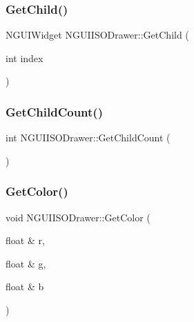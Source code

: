 \subsubsection{\texorpdfstring{Get\+Child()}{GetChild()}\hspace{0.1cm}{\footnotesize\ttfamily [2/2]}}
{\footnotesize\ttfamily N\+G\+U\+I\+Widget N\+G\+U\+I\+I\+S\+O\+Drawer\+::\+Get\+Child (\begin{DoxyParamCaption}\item[{int}]{index }\end{DoxyParamCaption})}

\hypertarget{class_n_g_u_i_i_s_o_drawer_a3f559cdeee31ddaca418e3ce149fdff7}{}\label{class_n_g_u_i_i_s_o_drawer_a3f559cdeee31ddaca418e3ce149fdff7} 
\subsubsection{\texorpdfstring{Get\+Child\+Count()}{GetChildCount()}}
{\footnotesize\ttfamily int N\+G\+U\+I\+I\+S\+O\+Drawer\+::\+Get\+Child\+Count (\begin{DoxyParamCaption}{ }\end{DoxyParamCaption})}

\hypertarget{class_n_g_u_i_i_s_o_drawer_acc22efa45128f1badc7ad6b805137ca4}{}\label{class_n_g_u_i_i_s_o_drawer_acc22efa45128f1badc7ad6b805137ca4} 
\subsubsection{\texorpdfstring{Get\+Color()}{GetColor()}}
{\footnotesize\ttfamily void N\+G\+U\+I\+I\+S\+O\+Drawer\+::\+Get\+Color (\begin{DoxyParamCaption}\item[{float \&}]{r,  }\item[{float \&}]{g,  }\item[{float \&}]{b }\end{DoxyParamCaption})}

\hypertarget{class_n_g_u_i_i_s_o_drawer_a960f5cc9dd0028df87a47b3ae975f6bf}{}\label{class_n_g_u_i_i_s_o_drawer_a960f5cc9dd0028df87a47b3ae975f6bf} 
